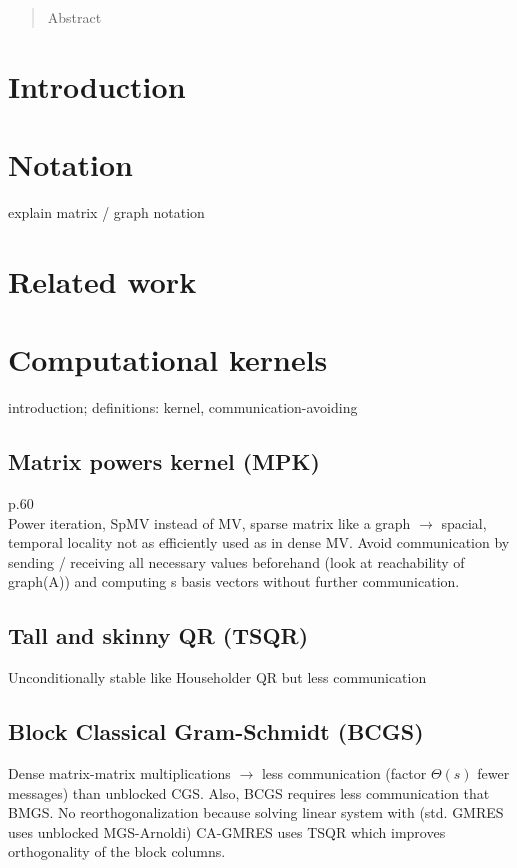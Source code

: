 \documentclass{scrartcl}
\begin{document}
\tableofcontents

\pagebreak

\begin{abstract}
Abstract
\end{abstract}
\section{Introduction}

\section{Notation}
explain matrix / graph notation
\section{Related work}


\section{Computational kernels}
introduction; definitions: kernel, communication-avoiding
\subsection{Matrix powers kernel (MPK)}
\cite{Hoemmen:2010:CKS:1970638} p.60\\
Power iteration, SpMV instead of MV, sparse matrix like a graph $\rightarrow$ spacial, temporal locality not as efficiently used as in dense MV. 
Avoid communication by sending / receiving all necessary values beforehand (look at reachability of graph(A)) and computing s basis vectors without further communication.

\subsection{Tall and skinny QR (TSQR)}
Unconditionally stable like Householder QR but less communication

\subsection{Block Classical Gram-Schmidt (BCGS)}
Dense matrix-matrix multiplications $\rightarrow$ less communication (factor $\Theta(s)$ fewer messages) than unblocked CGS. Also, BCGS requires less communication that BMGS.
No reorthogonalization because solving linear system with (std. GMRES uses unblocked MGS-Arnoldi) CA-GMRES uses TSQR which improves orthogonality of the block columns.
\end{document}
